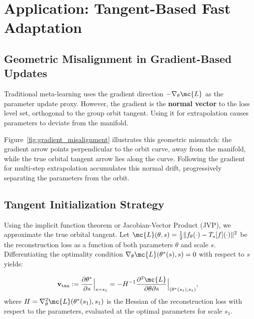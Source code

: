 \section{Application: Tangent-Based Fast Adaptation}
\label{sec:application}

\subsection{Geometric Misalignment in Gradient-Based Updates}
\label{sec:misalignment}

Traditional meta-learning uses the gradient direction $-\nabla_\theta \mc{L}$ as the parameter update proxy.
However, the gradient is the \textbf{normal vector} to the loss level set, orthogonal to the group orbit tangent.
Using it for extrapolation causes parameters to deviate from the manifold.

Figure~\ref{fig:gradient_misalignment} illustrates this geometric mismatch: the gradient arrow points perpendicular to the orbit curve, away from the manifold, while the true orbital tangent arrow lies along the curve.
Following the gradient for multi-step extrapolation accumulates this normal drift, progressively separating the parameters from the orbit.



\subsection{Tangent Initialization Strategy}
\label{sec:tangent_init}

Using the implicit function theorem or Jacobian-Vector Product (JVP), we approximate the true orbital tangent.
Let $\mc{L}(\theta, s) = \frac{1}{2}\|f_{\theta}(\cdot) - T_s[f](\cdot)\|^2$ be the reconstruction loss as a function of both parameters $\theta$ and scale $s$.
Differentiating the optimality condition $\nabla_\theta \mc{L}(\theta^*(s), s) = 0$ with respect to $s$ yields:

\begin{equation}
    \mathbf{v}_{\mathrm{tan}} := \frac{\partial \theta^*}{\partial s}\Big|_{s=s_1}
    = -H^{-1} \frac{\partial^2 \mc{L}}{\partial \theta \partial s}\Big|_{(\theta^*(s_1), s_1)},
    \label{eq:tangent_approx}
\end{equation}
where $H = \nabla_\theta^2 \mc{L}(\theta^*(s_1), s_1)$ is the Hessian of the reconstruction loss with respect to the parameters, evaluated at the optimal parameters for scale $s_1$.

